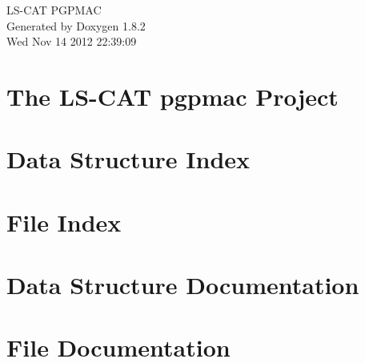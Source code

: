 \documentclass{book}
\begin{document}
\hypersetup{pageanchor=false,citecolor=blue}
\begin{titlepage}
\vspace*{7cm}
\begin{center}
{\Large L\-S-\/\-C\-A\-T P\-G\-P\-M\-A\-C }\\
\vspace*{1cm}
{\large Generated by Doxygen 1.8.2}\\
\vspace*{0.5cm}
{\small Wed Nov 14 2012 22:39:09}\\
\end{center}
\end{titlepage}
\clearemptydoublepage
{}
\tableofcontents
\clearemptydoublepage
{}
\hypersetup{pageanchor=true,citecolor=blue}
\chapter{The L\-S-\/\-C\-A\-T pgpmac Project}
\label{index}\hypertarget{index}{}
\chapter{Data Structure Index}

\chapter{File Index}

\chapter{Data Structure Documentation}
















\chapter{File Documentation}










\printindex
\end{document}

